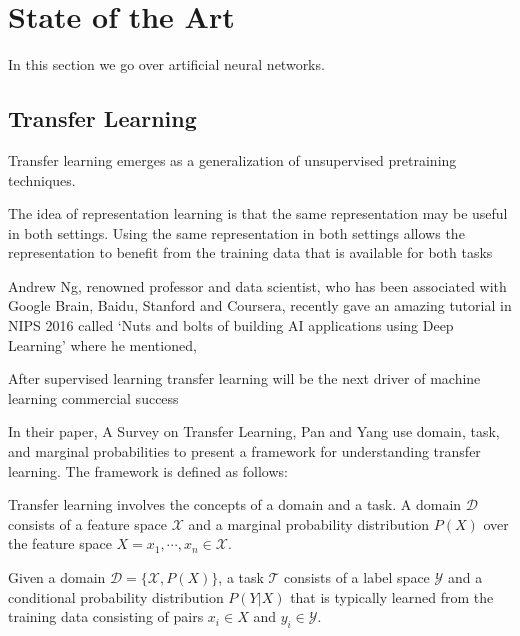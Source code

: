 \chapter{State of the Art}
\label{chapter:sota}

In this section we go over artificial neural networks.

\section{Transfer Learning}


Transfer learning emerges as a generalization of unsupervised pretraining techniques.

The idea of representation learning is that the same representation may be useful in both settings. Using the same representation in both settings allows the representation to benefit from the training data that is available for both tasks

Andrew Ng, renowned professor and data scientist, who has been associated with Google Brain, Baidu, Stanford and Coursera, recently gave an amazing tutorial in NIPS 2016 called ‘Nuts and bolts of building AI applications using Deep Learning’ where he mentioned,

After supervised learning transfer learning will be the next driver of machine learning commercial success


In their paper, A Survey on Transfer Learning, Pan and Yang use domain, task, and marginal probabilities to present a framework for understanding transfer learning. The framework is defined as follows:

Transfer learning involves the concepts of a domain and a task. A domain $\mathcal{D}$ consists of a feature space $\mathcal{X}$ and a marginal probability distribution $P(X)$ over the feature space $X = {x_1, \cdots, x_n} \in \mathcal{X}$.

Given a domain $\mathcal{D} = \{\mathcal{X},P(X)\}$, a task $\mathcal{T}$ consists of a label space $\mathcal{Y}$ and a conditional probability distribution $P(Y|X)$ that is typically learned from the training data consisting of pairs $x_i \in X$ and $y_i \in \mathcal{Y}$.

